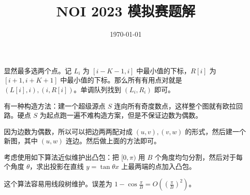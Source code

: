 \documentclass{oisolution}
\begin{document}
\title{NOI 2023 模拟赛\quad 题解}
\date{\today}
\solutiontitle


显然最多选两个点。记 $L_i$ 为 $[i-K-1,i]$ 中最小值的下标，$R[i]$ 为 $[i+1,i+K+1]$ 中最小值的下标。那么所有有用点对就是 $(L[i],i),(i,R[i])$。单调队列找到 $(L_i,R_i)$ 即可。


有一种构造方法：建一个超级源点 $S$ 连向所有奇度数点，这样整个图就有欧拉回路。硬点 $S$ 为起点跑一遍不难构造方案，但是不保证边数为偶数。

因为边数为偶数，所以可以把边两两配对成 $(u,v),(v,w)$ 的形式，然后建一个新图，其中 $(u,w)$ 连边。然后做上面的方法即可。


考虑使用如下算法近似维护出凸包：把 $[0,\pi)$ 用 $B$ 个角度均匀分割，然后对于每个角度 $\theta$，求出投影在直线 $y=\tan\theta x$ 上最两端的点加入凸包。

这个算法容易用线段树维护。误差为 $\displaystyle 1-\cos\frac{\pi}{B}=O\left(\left(\frac{\pi}{B}\right)^2\right)$。
\end{document}
